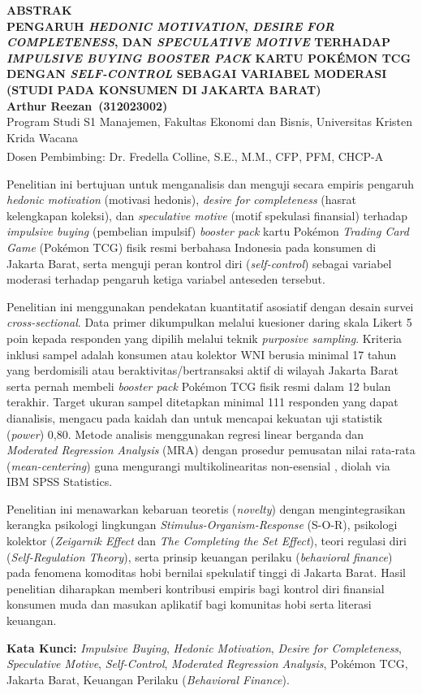 \documentclass[12pt,a4paper]{article}
\numberwithin{equation}{section}
\numberwithin{table}{section}
\numberwithin{figure}{section}
\newcommand{\ukrida}{Universitas Kristen Krida Wacana}
\newcommand{\feb}{Fakultas Ekonomi dan Bisnis}
\newcommand{\prodi}{Program Studi S1 Manajemen}
\newcommand{\namamahasiswa}{Arthur Reezan}
\newcommand{\nim}{312023002}
\newcommand{\dosbim}{Dr. Fredella Colline, S.E., M.M., CFP\textsuperscript{\textregistered}, PFM, CHCP-A}
\newcommand{\judulskripsi}{PENGARUH \emph{HEDONIC MOTIVATION}, \emph{DESIRE FOR COMPLETENESS}, DAN \emph{SPECULATIVE MOTIVE} TERHADAP \emph{IMPULSIVE BUYING} \emph{BOOSTER PACK} KARTU POK\'EMON TCG DENGAN \emph{SELF-CONTROL} SEBAGAI VARIABEL MODERASI (STUDI PADA KONSUMEN DI JAKARTA BARAT)}
\begin{document}
\begin{singlespace}
\begin{center}
  {\large\bfseries ABSTRAK}\\[0.2cm]
  {\bfseries\judulskripsi}\\[0.2cm]
  {\bfseries\namamahasiswa\ (\nim)}\\[0.05cm]
  {\footnotesize \prodi, \feb, \ukrida}\\[0.05cm]
  {\footnotesize Dosen Pembimbing: \dosbim}
\end{center}

\vspace{0.15cm}
Penelitian ini bertujuan untuk menganalisis dan menguji secara empiris pengaruh \emph{hedonic motivation} (motivasi hedonis), \emph{desire for completeness} (hasrat kelengkapan koleksi), dan \emph{speculative motive} (motif spekulasi finansial) terhadap \emph{impulsive buying} (pembelian impulsif) \emph{booster pack} kartu Pok\'emon \emph{Trading Card Game} (Pok\'emon TCG) fisik resmi berbahasa Indonesia pada konsumen di Jakarta Barat, serta menguji peran kontrol diri (\emph{self-control}) sebagai variabel moderasi terhadap pengaruh ketiga variabel anteseden tersebut.

Penelitian ini menggunakan pendekatan kuantitatif asosiatif dengan desain survei \emph{cross-sectional}. Data primer dikumpulkan melalui kuesioner daring skala Likert 5 poin kepada responden yang dipilih melalui teknik \emph{purposive sampling}. Kriteria inklusi sampel adalah konsumen atau kolektor WNI berusia minimal 17 tahun yang berdomisili atau beraktivitas/bertransaksi aktif di wilayah Jakarta Barat serta pernah membeli \emph{booster pack} Pok\'emon TCG fisik resmi dalam 12 bulan terakhir. Target ukuran sampel ditetapkan minimal 111 responden yang dapat dianalisis, mengacu pada kaidah \citet{green1991subjects} dan \citet{cohen1988statistical} untuk mencapai kekuatan uji statistik (\emph{power}) 0,80. Metode analisis menggunakan regresi linear berganda dan \emph{Moderated Regression Analysis} (MRA) dengan prosedur pemusatan nilai rata-rata (\emph{mean-centering}) guna mengurangi multikolinearitas non-esensial \citep{aiken1991multiple, hayes2018introduction}, diolah via IBM SPSS Statistics.

Penelitian ini menawarkan kebaruan teoretis (\emph{novelty}) dengan mengintegrasikan kerangka psikologi lingkungan \emph{Stimulus-Organism-Response} (S-O-R), psikologi kolektor (\emph{Zeigarnik Effect} dan \emph{The Completing the Set Effect}), teori regulasi diri (\emph{Self-Regulation Theory}), serta prinsip keuangan perilaku (\emph{behavioral finance}) pada fenomena komoditas hobi bernilai spekulatif tinggi di Jakarta Barat. Hasil penelitian diharapkan memberi kontribusi empiris bagi kontrol diri finansial konsumen muda dan masukan aplikatif bagi komunitas hobi serta literasi keuangan.

\vspace{0.2cm}
\noindent\textbf{Kata Kunci:} \emph{Impulsive Buying}, \emph{Hedonic Motivation}, \emph{Desire for Completeness}, \emph{Speculative Motive}, \emph{Self-Control}, \emph{Moderated Regression Analysis}, Pok\'emon TCG, Jakarta Barat, Keuangan Perilaku (\emph{Behavioral Finance}).
\end{singlespace}
\end{document}
